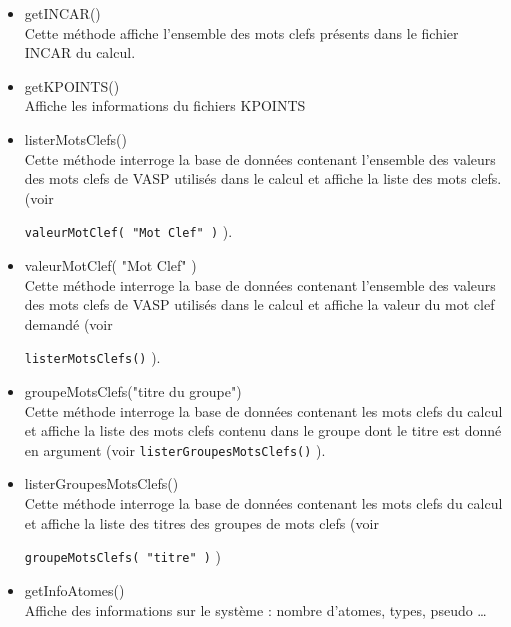 \documentclass[10pt,a4paper,fleqn]{article}
\begin{document}
\begin{itemize}
	\item getINCAR() \\

		Cette méthode affiche l'ensemble des mots clefs présents dans le fichier INCAR
		du calcul. \\

	\item getKPOINTS() \\

		Affiche les informations du fichiers KPOINTS \\

	\item listerMotsClefs() \\

		Cette méthode interroge la base de données contenant l'ensemble des valeurs des
		mots clefs de VASP utilisés dans le calcul et affiche la liste des mots clefs.
		(voir\par \verb!valeurMotClef( "Mot Clef" )! ). \\

	\item valeurMotClef( "Mot Clef" ) \\

		Cette méthode interroge la base de données contenant l'ensemble des valeurs des
		mots clefs de VASP utilisés dans le calcul et affiche la valeur du mot clef
		demandé (voir\par \verb!listerMotsClefs()! ). \\

	\item groupeMotsClefs("titre du groupe") \\

		Cette méthode interroge la base de données contenant les mots clefs du calcul
		et affiche la liste des mots clefs contenu dans le groupe dont le titre est donné en
		argument (voir \verb!listerGroupesMotsClefs()! ). \\

	\item listerGroupesMotsClefs() \\

		Cette méthode interroge la base de données contenant les mots clefs du calcul
		et affiche la liste des titres des groupes de mots clefs (voir \par
		\verb!groupeMotsClefs( "titre" )! ) \\

	\item getInfoAtomes() \\

		Affiche des informations sur le système : nombre d'atomes, types, pseudo \ldots \\

\end{itemize}
\end{document}
